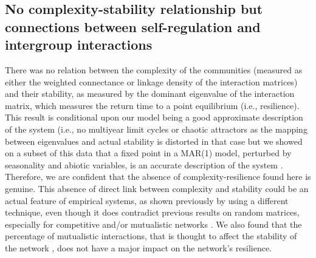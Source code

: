 \documentclass[10pt]{article}
\begin{document}
\subsection*{No complexity-stability relationship but connections between self-regulation
and intergroup interactions}

There was no relation between the complexity of the communities (measured
as either the weighted connectance or linkage density of the interaction
matrices) and their stability, as measured by the dominant eigenvalue
of the interaction matrix, which measures the return time to a point
equilibrium (i.e., resilience). This result is conditional upon our model being a good
approximate description of the system (i.e., no multiyear limit cycles
or chaotic attractors as the mapping between eigenvalues and actual
stability is distorted in that case \citep{certain_how_2018}
but we showed on a subset of this data that a fixed point in a MAR(1)
model, perturbed by seasonality and abiotic variables, is an accurate
description of the system \citep{barraquand_coastal_2018}. Therefore,
we are confident that the absence of complexity-resilience found here
is genuine. This absence of direct link between complexity and stability
could be an actual feature of empirical systems, as shown previously
by \citet{jacquet_no_2016} using a different technique,
even though it does contradict previous results on random matrices,
especially for competitive and/or mutualistic networks \citep{allesina_stability_2012}.
We also found that the percentage of mutualistic interactions, that
is thought to affect the stability of the network \citep{mougi2012diversity,coyte_ecology_2015,garcia-callejas_multiple_2018},
does not have a major impact on the network's resilience.
\end{document}
